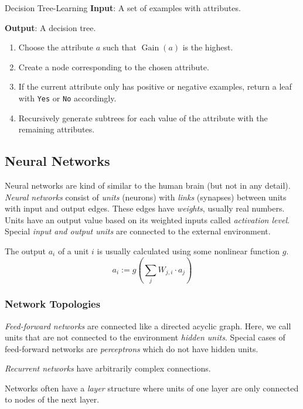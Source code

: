 \documentclass[english]{panikzettel}
\begin{document}
\begin{algo}{Decision Tree-Learning}
\textbf{Input}: A set of examples with attributes.

\textbf{Output}: A decision tree.
\tcblower
\begin{enumerate}
    \item Choose the attribute $a$ such that $\operatorname{Gain}(a)$ is the highest.
    \item Create a node corresponding to the chosen attribute.
    \item If the current attribute only has positive or negative examples, return a leaf with \texttt{Yes} or \texttt{No} accordingly.
    \item Recursively generate subtrees for each value of the attribute with the remaining attributes.
\end{enumerate}
\end{algo}

\subsection{Neural Networks}

Neural networks are kind of similar to the human brain (but not in any detail).
\emph{Neural networks} consist of \emph{units} (neurons) with \emph{links} (synapses) between units with input and output edges.
These edges have \emph{weights}, usually real numbers.
Units have an output value based on its weighted inputs called \emph{activation level}.
Special \emph{input and output units} are connected to the external environment.

The output $a_i$ of a unit $i$ is usually calculated using some nonlinear function $g$.
\[ a_i := g \left( \sum_j W_{j,i} \cdot a_j \right) \]

\subsubsection{Network Topologies}

\emph{Feed-forward networks} are connected like a directed acyclic graph.
Here, we call units that are not connected to the environment \emph{hidden units}.
Special cases of feed-forward networks are \emph{perceptrons} which do not have hidden units.

\emph{Recurrent networks} have arbitrarily complex connections.

Networks often have a \emph{layer} structure where units of one layer are only connected to nodes of the next layer.
\end{document}
